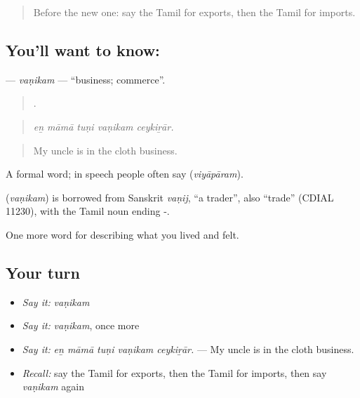 \label{lesson:TA-C511-vanikam}



\begin{quote}
Before the new one: say the Tamil for exports, then the Tamil for imports.
\end{quote}

\subsection*{You'll want to know: }
\textbf{} — \emph{vaṇikam} — \textquotedblleft{}business; commerce\textquotedblright{}.

\begin{quote}
    .
\end{quote}

\begin{quote}
\emph{eṉ māmā tuṇi vaṇikam ceykiṟār.}
\end{quote}

\begin{quote}
My uncle is in the cloth business.
\end{quote}

A formal word; in speech people often say  (\emph{viyāpāram}).

\begin{cousinweb}
\textbf{} (\emph{vaṇikam}) is borrowed from Sanskrit \emph{vaṇij}, \textquotedblleft{}a trader\textquotedblright{}, also \textquotedblleft{}trade\textquotedblright{} (CDIAL 11230), with the Tamil noun ending -.
\end{cousinweb}

\begin{grammarlens}[title={What you've built}]
One more word for describing what you lived and felt.
\end{grammarlens}

\subsection*{Your turn}
\begin{itemize}
\raggedright
  \item \emph{Say it:} \emph{vaṇikam}
  \item \emph{Say it:} \emph{vaṇikam}, once more
  \item \emph{Say it:} \emph{eṉ māmā tuṇi vaṇikam ceykiṟār.} — My uncle is in the cloth business.
  \item \emph{Recall:} say the Tamil for exports, then the Tamil for imports, then say \emph{vaṇikam} again
\end{itemize}

